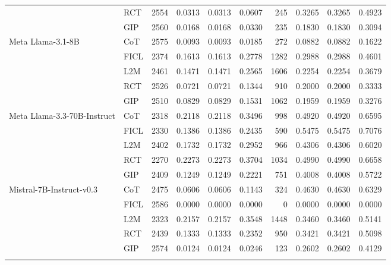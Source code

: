 \documentclass[conference]{IEEEtran}
\begin{document}
\begin{table}[t]
\begin{tabular}{@{} p{3.5cm} l r r r r r r r r@{}}
                          & RCT  & 2554 & 0.0313 & 0.0313 & 0.0607 & 245 & 0.3265 & 0.3265 & 0.4923 \\
                          & GIP  & 2560 & 0.0168 & 0.0168 & 0.0330 & 235 & 0.1830 & 0.1830 & 0.3094 \\ \hline
\addlinespace
Meta Llama-3.1-8B            & CoT & 2575 & 0.0093 & 0.0093 & 0.0185 & 272 & 0.0882 & 0.0882 & 0.1622 \\
                          & FICL & 2374 & 0.1613 & 0.1613 & 0.2778 & 1282 & 0.2988 & 0.2988 & 0.4601 \\
                          & L2M  & 2461 & 0.1471 & 0.1471 & 0.2565 & 1606 & 0.2254 & 0.2254 & 0.3679 \\
                          & RCT  & 2526 & 0.0721 & 0.0721 & 0.1344 & 910 & 0.2000 & 0.2000 & 0.3333 \\
                          & GIP  & 2510 & 0.0829 & 0.0829 & 0.1531 & 1062 & 0.1959 & 0.1959 & 0.3276 \\ \hline
\addlinespace
Meta Llama-3.3-70B-Instruct & CoT & 2318 & 0.2118 & 0.2118 & 0.3496 & 998 & 0.4920 & 0.4920 & 0.6595 \\
                          & FICL & 2330 & 0.1386 & 0.1386 & 0.2435 & 590 & 0.5475 & 0.5475 & 0.7076 \\
                          & L2M  & 2402 & 0.1732 & 0.1732 & 0.2952 & 966 & 0.4306 & 0.4306 & 0.6020 \\
                          & RCT  & 2270 & 0.2273 & 0.2273 & 0.3704 & 1034 & 0.4990 & 0.4990 & 0.6658 \\
                          & GIP  & 2409 & 0.1249 & 0.1249 & 0.2221 & 751 & 0.4008 & 0.4008 & 0.5722 \\ \hline
\addlinespace
Mistral-7B-Instruct-v0.3    & CoT & 2475 & 0.0606 & 0.0606 & 0.1143 & 324 & 0.4630 & 0.4630 & 0.6329 \\
                          & FICL & 2586 & 0.0000 & 0.0000 & 0.0000 & 0 & 0.0000 & 0.0000 & 0.0000 \\
                          & L2M  & 2323 & 0.2157 & 0.2157 & 0.3548 & 1448 & 0.3460 & 0.3460 & 0.5141 \\
                          & RCT  & 2439 & 0.1333 & 0.1333 & 0.2352 & 950 & 0.3421 & 0.3421 & 0.5098 \\
                          & GIP  & 2574 & 0.0124 & 0.0124 & 0.0246 & 123 & 0.2602 & 0.2602 & 0.4129 \\ 
\addlinespace
\bottomrule
\end{tabular}
\end{table}
\end{document}
